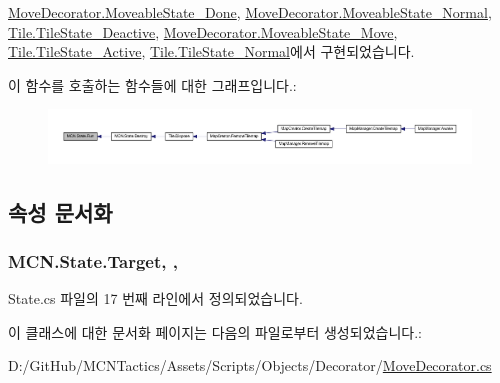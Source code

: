 \hyperlink{class_move_decorator_1_1_moveable_state___done_ad6aac25a9f42d14a958d1c93e3b6bd79}{Move\+Decorator.\+Moveable\+State\+\_\+\+Done}, \hyperlink{class_move_decorator_1_1_moveable_state___normal_a9e4e591aa61c13840a15facffa2148d6}{Move\+Decorator.\+Moveable\+State\+\_\+\+Normal}, \hyperlink{class_tile_1_1_tile_state___deactive_a806c5dbc5eb43903ad41d448f3d25c61}{Tile.\+Tile\+State\+\_\+\+Deactive}, \hyperlink{class_move_decorator_1_1_moveable_state___move_ae1bb2c9ca5992373aa872788775d3e4a}{Move\+Decorator.\+Moveable\+State\+\_\+\+Move}, \hyperlink{class_tile_1_1_tile_state___active_ab53c7c818d65122d6d36c9681ca53bf9}{Tile.\+Tile\+State\+\_\+\+Active}, \hyperlink{class_tile_1_1_tile_state___normal_acf613382b6ddeff2fcc226d8caeb0b53}{Tile.\+Tile\+State\+\_\+\+Normal}에서 구현되었습니다.



이 함수를 호출하는 함수들에 대한 그래프입니다.\+:\nopagebreak
\begin{figure}[H]
\begin{center}
\leavevmode
\includegraphics[width=350pt]{class_m_c_n_1_1_state_afdec72a816a8a8ec584cac758a027215_icgraph}
\end{center}
\end{figure}




\subsection{속성 문서화}
\subsubsection[{\texorpdfstring{Target}{Target}}]{ M\+C\+N.\+State.\+Target\hspace{0.3cm}{\ttfamily [get]}, {\ttfamily [protected]}, {\ttfamily [inherited]}}\hypertarget{class_m_c_n_1_1_state_a79a563b32f183c9adc9a96679fc57eb8}{}\label{class_m_c_n_1_1_state_a79a563b32f183c9adc9a96679fc57eb8}


State.\+cs 파일의 17 번째 라인에서 정의되었습니다.



이 클래스에 대한 문서화 페이지는 다음의 파일로부터 생성되었습니다.\+:\begin{DoxyCompactItemize}
\item 
D\+:/\+Git\+Hub/\+M\+C\+N\+Tactics/\+Assets/\+Scripts/\+Objects/\+Decorator/\hyperlink{_move_decorator_8cs}{Move\+Decorator.\+cs}\end{DoxyCompactItemize}
